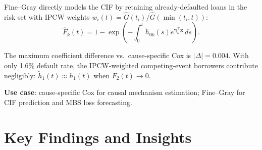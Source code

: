\documentclass[11pt,a4paper]{article}
\begin{document}
Fine--Gray directly models the CIF by retaining already-defaulted loans in the risk set
with IPCW weights $w_i(t) = \hat{G}(t_i)/\hat{G}(\min(t_i, t))$:
\begin{equation}
  \hat{F}_k(t) = 1 - \exp\!\left(-\int_0^t \tilde{h}_{0k}(s)e^{\boldsymbol{\gamma}_k^\top\mathbf{x}}\,ds\right).
\end{equation}

The maximum coefficient difference vs.\ cause-specific Cox is $|\Delta| = 0.004$.
With only 1.6\% default rate, the IPCW-weighted competing-event borrowers contribute
negligibly: $\tilde{h}_1(t) \approx h_1(t)$ when $F_2(t) \to 0$.

\textbf{Use case}: cause-specific Cox for causal mechanism estimation;
Fine--Gray for CIF prediction and MBS loss forecasting.

\section{Key Findings and Insights}
\end{document}
